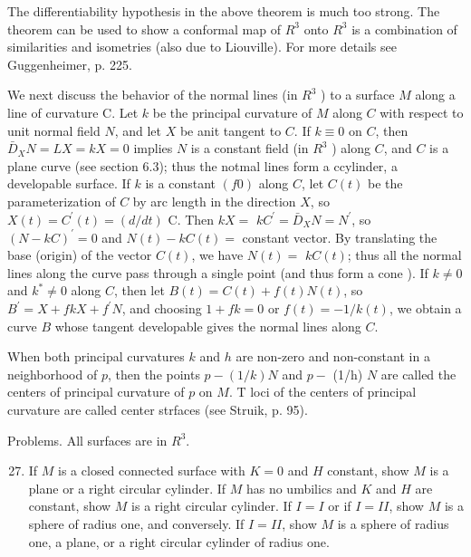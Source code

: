 \documentclass[10pt]{article}
\begin{document}
The differentiability hypothesis in the above theorem is much too strong. The theorem can be used to show a conformal map of $R^{3}$ onto $R^{3}$ is a combination of similarities and isometries (also due to Liouville). For more details see Guggenheimer, p. 225.

We next discuss the behavior of the normal lines (in $R^{3}$ ) to a surface $M$ along a line of curvature C. Let $k$ be the principal curvature of $M$ along $C$ with respect to unit normal field $N$, and let $X$ be anit tangent to $C$. If $k \equiv 0$ on $C$, then $\bar{D}_{X} N=L X=k X=0$ implies $N$ is a constant field (in $R^{3}$ ) along $C$, and $C$ is a plane curve (see section 6.3); thus the notmal lines form a ccylinder, a developable surface. If $k$ is a constant $(f 0)$ along $C$, let $C(t)$ be the parameterization of $C$ by arc length in the direction $X$, so $X(t)=C^{\prime}(t)=(d / d t)$ C. Then $k X=$ $k C^{\prime}=\bar{D}_{X} N=N^{\prime}$, so $(N-k C)^{\prime}=0$ and $N(t)-k C(t)=$ constant vector. By translating the base (origin) of the vector $C(t)$, we have $N(t)=$ $k C(t)$; thus all the normal lines along the curve pass through a single point (and thus form a cone ). If $k \neq 0$ and $k^{*} \neq 0$ along $C$, then let $B(t)=C(t)+f(t) N(t)$, so $B^{\prime}=X+f k X+f^{\prime} N$, and choosing $1+f k=0$ or $f(t)=-1 / k(t)$, we obtain a curve $B$ whose tangent developable gives the normal lines along $C$.

When both principal curvatures $k$ and $h$ are non-zero and non-constant in a neighborhood of $p$, then the points $p-(1 / k) N$ and $p-$ (1/h) $N$ are called the centers of principal curvature of $p$ on $M$. T loci of the centers of principal curvature are called center strfaces (see Struik, p. 95).

Problems. All surfaces are in $R^{3}$.

\begin{enumerate}
  \setcounter{enumi}{26}
  \item If $M$ is a closed connected surface with $K=0$ and $H$ constant, show $M$ is a plane or a right circular cylinder. If $M$ has no umbilics and $K$ and $H$ are constant, show $M$ is a right circular cylinder. If $I=I$ or if $I=I I$, show $M$ is a sphere of radius one, and conversely. If $I=I I$, show $M$ is a sphere of radius one, a plane, or a right circular cylinder of radius one.
\end{enumerate}
\end{document}
